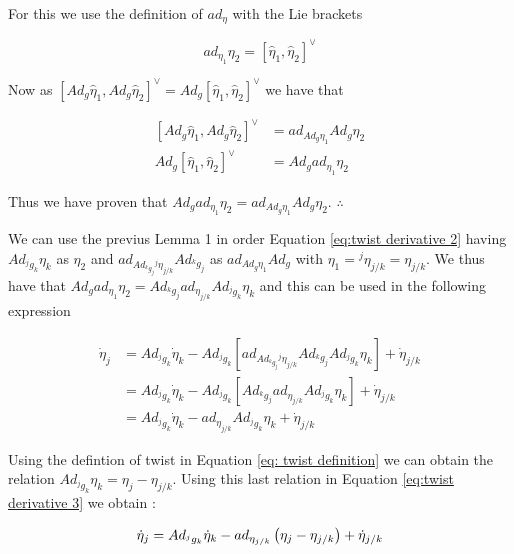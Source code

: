 \documentclass[12pt,a4paper]{book}
\begin{document}
For this we use the definition of $ad_\eta$ with the Lie brackets

\begin{equation}
	ad_{\eta_1}\eta_2 = \left[\hat{\eta}_1, \hat{\eta}_2 \right]^\vee
\end{equation}

Now as $\left[Ad_g \hat{\eta}_1, Ad_g  \hat{\eta}_2 \right]^\vee = Ad_g  \left[\hat{\eta}_1, \hat{\eta}_2 \right]^\vee$
we have that 

\begin{equation}
\begin{aligned}
	\left[Ad_g \hat{\eta}_1, Ad_g  \hat{\eta}_2 \right]^\vee &= ad_{Ad_g\eta_1} Ad_g \eta_2 \\
	Ad_g  \left[\hat{\eta}_1, \hat{\eta}_2 \right]^\vee		&= Ad_g ad_{\eta_1}\eta_2
\end{aligned}
\end{equation}

Thus we have proven that $Ad_g ad_{\eta_1}\eta_2 = ad_{Ad_g\eta_1} Ad_g \eta_2$. $\therefore$


We can use the previus Lemma 1 in order Equation \eqref{eq:twist derivative 2} having $Ad_{^jg_k} \eta_k$ as $\eta_2$ and $ad_{Ad_{^kg_j} {^j {\eta}}_{j/k}} Ad_{^kg_j} $ as $ad_{Ad_g\eta_1} Ad_g$ with $\eta_1 = {^j {\eta}}_{j/k} = {\eta}_{j/k}$. We thus have that $Ad_g ad_{\eta_1}\eta_2 = Ad_{^kg_j} ad_{{\eta}_{j/k}} Ad_{^jg_k} \eta_k$ and this can be used in the following expression

\begin{equation}\label{eq:twist derivative 3}
\begin{aligned}
	\dot{\eta}_j 	&= Ad_{^jg_k} \dot{\eta}_k -  Ad_{^jg_k} \left[ ad_{Ad_{^kg_j} {^j {\eta}}_{j/k}} Ad_{^kg_j}  Ad_{^jg_k} \eta_k \right] + \dot{\eta}_{j/k} \\
					&= Ad_{^jg_k} \dot{\eta}_k - Ad_{^jg_k} \left[ Ad_{^kg_j} ad_{{\eta}_{j/k}} Ad_{^jg_k} \eta_k \right] + \dot{\eta}_{j/k} \\
					&= Ad_{^jg_k} \dot{\eta}_k - ad_{{\eta}_{j/k}} Ad_{^jg_k} \eta_k + \dot{\eta}_{j/k} 
\end{aligned}
\end{equation}

Using the defintion of twist in Equation \eqref{eq: twist definition} we can obtain the relation $Ad_{^jg_k} \eta_k = \eta_j - \eta_{j/k}$. Using this last relation in Equation \eqref{eq:twist derivative 3} we obtain :

\begin{equation}\label{eq:twist derivative 4}
	\dot{\eta}_j 	= Ad_{^jg_k} \dot{\eta}_k - ad_{{\eta}_{j/k}} \left( \eta_j - \eta_{j/k} \right) + \dot{\eta}_{j/k} \\
\end{equation}
\end{document}
